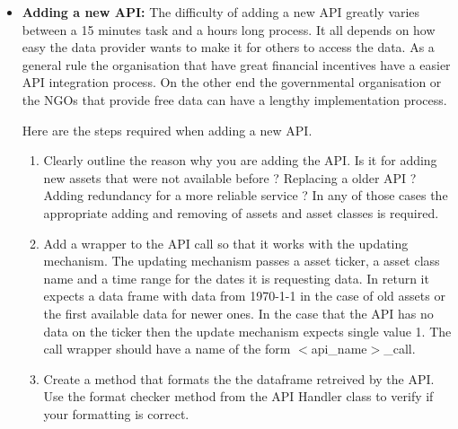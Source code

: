 \documentclass[main.tex]{subfiles}
\begin{document}
\begin{itemize}
    \item \textbf{Adding a new API: \newline}
        The difficulty of adding a new API greatly varies between a 15 minutes task and a hours long process. It all depends on how easy the data provider wants to make it for others to access the data. As a general rule the organisation that have great financial incentives have a easier API integration process. On the other end the governmental organisation or the NGOs that provide free data can have a lengthy implementation process.
        
        Here are the steps required when adding a new API. 
        \begin{enumerate}
            \item Clearly outline the reason why you are adding the API. Is it for adding new assets that were not available before ? Replacing a older API ? Adding redundancy for a more reliable service ?
            In any of those cases the appropriate adding and removing of assets and asset classes is required.
            \item Add a wrapper to the API call so that it works with the updating mechanism. The updating mechanism passes a asset ticker, a asset class name and a time range for the dates it is requesting data. In return it expects a data frame with data from 1970-1-1 in the case of old assets or the first available data for newer ones. In the case that the API has no data on the ticker then the update mechanism expects single value 1. The call wrapper should have a name of the form $<$api\_name$>$\_call. 
            \item Create a method that formats the the dataframe retreived by the API. Use the format checker method from the API Handler class to verify if your formatting is correct. 
        \end{enumerate}
    

\end{itemize}
\end{document}
